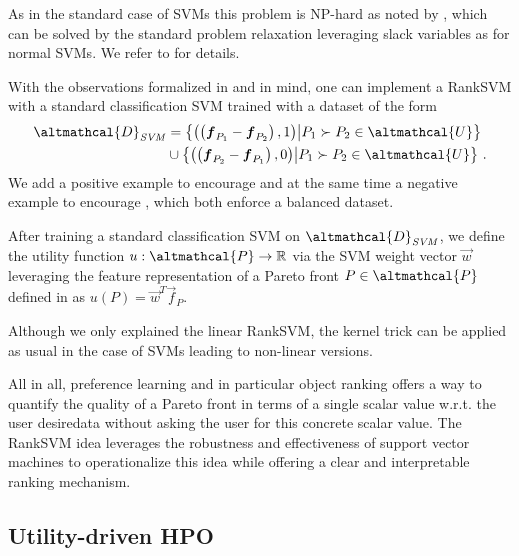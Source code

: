 As in the standard case of SVMs this problem is NP-hard as noted by \cite{joachims2002optimizing}, which can be solved by the standard problem relaxation leveraging slack variables as for normal SVMs. We refer to \cite{joachims2002optimizing} for details. 

With the observations formalized in  and  in mind, one can implement a RankSVM with a standard classification SVM trained with a dataset of the form 
\begin{equation}
\begin{split}
    \altmathcal{D}_{\mathit{SVM}} &= \left\{ \left(\left(\vec{f}_{P_{1}}-\vec{f}_{P_{2}}\right), 1\right) \middle\vert  P_{1} \succ P_{2} \in \altmathcal{U} \right\} \\
    &\cup \left\{ \left(\left(\vec{f}_{P_{2}}-\vec{f}_{P_{1}}\right), 0\right) \middle\vert  P_{1} \succ P_{2} \in \altmathcal{U} \right\} \, .
\end{split}
\end{equation}
We add a positive example to encourage  and at the same time a negative example to encourage , which both enforce a balanced dataset.

After training a standard classification SVM on $\altmathcal{D}_{\mathit{SVM}}$, we define the utility function $u: \altmathcal{P} \rightarrow \mathbb{R}$ via the SVM weight vector $\vec{w}$ leveraging the feature representation of a Pareto front $P \in \altmathcal{P}$ defined in  as $u(P) = \vec{w}^T\vec{f}_P$.

Although we only explained the linear RankSVM, the kernel trick \cite{scholkopf-book02} can be applied as usual in the case of SVMs leading to non-linear versions.



All in all, preference learning and in particular object ranking offers a way to quantify the quality of a Pareto front in terms of a single scalar value w.r.t. the user desiredata without asking the user for this concrete scalar value.
The RankSVM idea leverages the robustness and effectiveness of support vector machines to operationalize this idea while offering a clear and interpretable ranking mechanism.

\subsection{Utility-driven HPO}
\label{moo-ssec:utility_automl}

